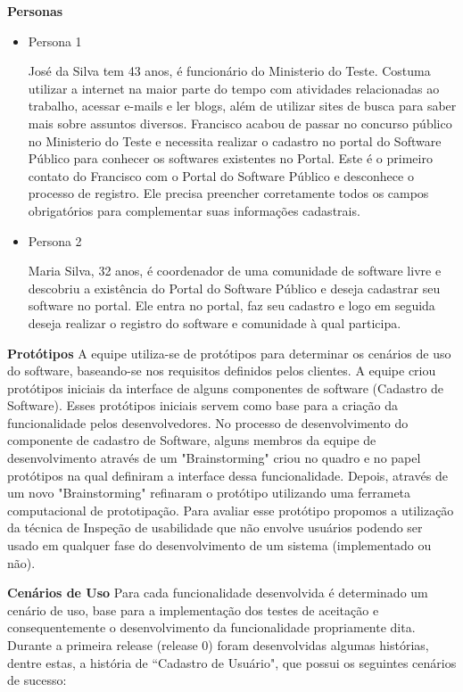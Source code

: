 \textbf{Personas}

\begin{itemize}

\item Persona 1

José da Silva tem 43 anos, é funcionário do Ministerio do Teste. Costuma utilizar a internet na maior parte do tempo com atividades relacionadas ao trabalho, acessar e-mails e ler blogs, além de utilizar sites de busca para saber mais sobre assuntos diversos.
Francisco acabou de passar no concurso público no Ministerio do Teste e necessita realizar o cadastro no portal do Software Público para conhecer os softwares existentes no Portal.
Este é o primeiro contato do Francisco com o Portal do Software Público e desconhece o processo de registro. Ele precisa preencher corretamente todos os campos obrigatórios para complementar suas informações cadastrais. 

\item Persona 2

Maria Silva, 32 anos, é coordenador de uma comunidade de software livre e descobriu a existência do Portal do Software Público e deseja cadastrar seu software no portal. Ele entra no portal, faz seu cadastro e logo em seguida deseja realizar o registro do software e comunidade à qual participa.

\end{itemize}

\textbf{Protótipos}
	A equipe utiliza-se de protótipos para determinar os cenários de uso do software, baseando-se nos requisitos definidos pelos clientes. 
	A equipe criou protótipos iniciais da interface de alguns componentes de software  (Cadastro de Software). Esses protótipos iniciais servem como base para a criação da funcionalidade pelos desenvolvedores. No processo de desenvolvimento do componente de cadastro de Software, alguns membros da equipe de desenvolvimento através de um "Brainstorming" criou no quadro e no papel protótipos na qual definiram a interface dessa funcionalidade. Depois, através de um novo "Brainstorming" refinaram o protótipo utilizando uma ferrameta computacional de prototipação. Para avaliar esse protótipo propomos a utilização da técnica de Inspeção de usabilidade  que não envolve usuários podendo ser usado em qualquer fase do desenvolvimento de um sistema (implementado ou não).
	
\textbf{Cenários de Uso}
	Para cada funcionalidade desenvolvida é determinado um cenário de uso, base para a implementação dos testes de aceitação e consequentemente o desenvolvimento da funcionalidade propriamente dita.
	Durante a primeira release (release 0) foram desenvolvidas algumas histórias, dentre estas, a história de ``Cadastro de Usuário", que possui os seguintes cenários de sucesso:

